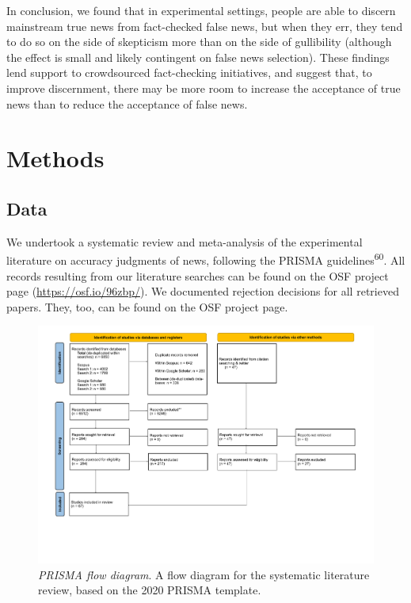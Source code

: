 \documentclass[
  doc,floatsintext]{apa6}
\begin{document}
In conclusion, we found that in experimental settings, people are able to discern mainstream true news from fact-checked false news, but when they err, they tend to do so on the side of skepticism more than on the side of gullibility (although the effect is small and likely contingent on false news selection). These findings lend support to crowdsourced fact-checking initiatives, and suggest that, to improve discernment, there may be more room to increase the acceptance of true news than to reduce the acceptance of false news.

\section{Methods}\label{methods}

\subsection{Data}\label{data}

We undertook a systematic review and meta-analysis of the experimental literature on accuracy judgments of news, following the PRISMA guidelines\textsuperscript{60}. All records resulting from our literature searches can be found on the OSF project page (\url{https://osf.io/96zbp/}). We documented rejection decisions for all retrieved papers. They, too, can be found on the OSF project page.



\begin{figure}
\centering
\includegraphics{literature_search/PRISMA_2020_flow_diagram.pdf}
\caption{\label{fig:prisma-flowchart}\emph{PRISMA flow diagram}. A flow diagram for the systematic literature review, based on the 2020 PRISMA template.}
\end{figure}
\end{document}

